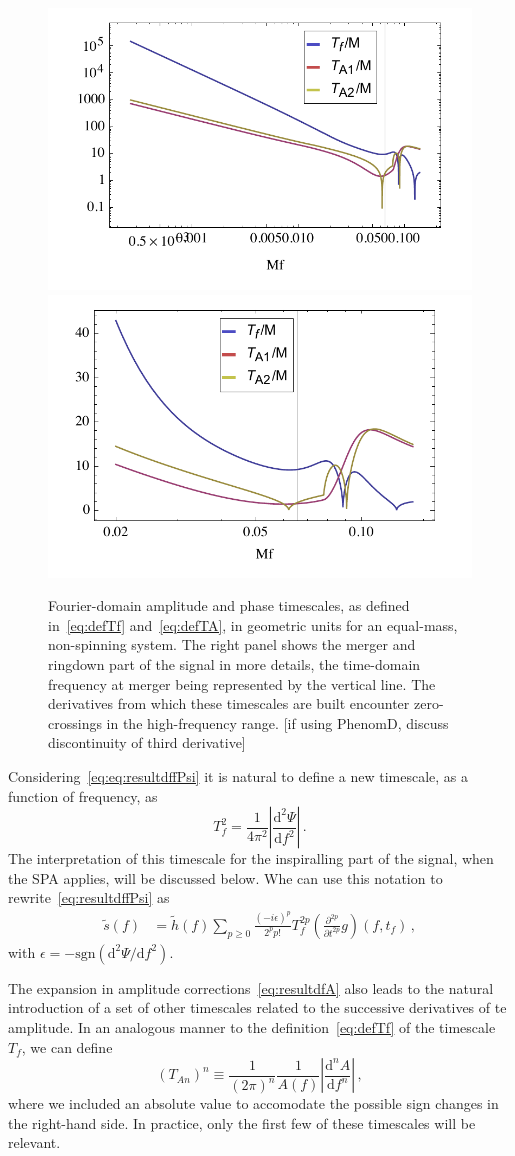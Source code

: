 \documentclass[aps,showpacs,%
prd,superscriptaddress,nofootinbib]{revtex4}
\newcommand{\be}{\begin{equation}}
\newcommand{\ee}{\end{equation}}
\newcommand\ud{{\mathrm{d}}}
\newcommand{\tf}{t_{f}}
\newcommand{\Tf}{T_{f}}
\begin{document}
\begin{figure}
  \centering
  \includegraphics[width=.48\linewidth]{plots/TfTA.pdf}
  \hspace{0.2cm}
  \includegraphics[width=.48\linewidth]{plots/TfTAzoom.pdf}
  \caption{Fourier-domain amplitude and phase timescales, as defined in~\eqref{eq:defTf} and~\eqref{eq:defTA}, in geometric units for an equal-mass, non-spinning system. The right panel shows the merger and ringdown part of the signal in more details, the time-domain frequency at merger being represented by the vertical line. The derivatives from which these timescales are built encounter zero-crossings in the high-frequency range. [if using PhenomD, discuss discontinuity of third derivative]}
  \label{fig:TfTA}
\end{figure}

Considering~\eqref{eq:eq:resultdffPsi} it is natural to define a new timescale, as a function of frequency, as
\be\label{eq:defTf}
	\Tf^{2} = \frac{1}{4\pi^{2}}\left| \frac{\ud^{2}\Psi}{\ud f^{2}} \right| \,.
\ee
The interpretation of this timescale for the inspiralling part of the signal, when the SPA applies, will be discussed below. Whe can use this notation to rewrite~\eqref{eq:resultdffPsi} as
\begin{align}\label{eq:resultdffPsiTf}
	 \tilde{s}(f) &= \tilde{h}(f) \sum\limits_{p\geq 0} \frac{(-i\epsilon)^{p}}{2^{p}p!} \Tf^{2p} \left( \frac{\partial^{2p} }{\partial t^{2p}} g \right)(f, \tf) \,,
\end{align}
with $\epsilon = -\mathrm{sgn}(\ud^{2}\Psi/\ud f^{2} )$.

The expansion in amplitude corrections~\eqref{eq:resultdfA} also leads to the natural introduction of a set of other timescales related to the successive derivatives of te amplitude. In an analogous manner to the definition~\eqref{eq:defTf} of the timescale $T_{f}$, we can define
\be\label{eq:defTA}
	\left( T_{An} \right)^{n} \equiv \frac{1}{(2 \pi)^{n}} \frac{1}{A(f)} \left| \frac{\ud^{n} A}{\ud f^{n}} \right| \,,
\ee
where we included an absolute value to accomodate the possible sign changes in the right-hand side. In practice, only the first few of these timescales will be relevant.
\end{document}
